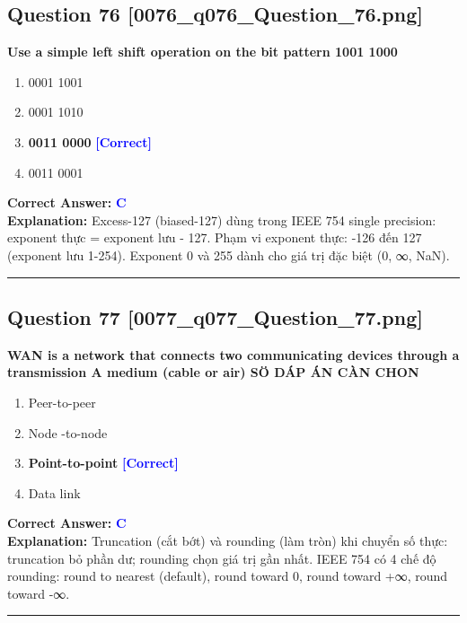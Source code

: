 \documentclass[11pt,a4paper]{article}
\begin{document}
\begin{minipage}{\textwidth}
\subsection*{Question 76 \quad \footnotesize{[0076\_q076\_Question\_76.png]}}
\noindent \textbf{Use a simple left shift operation on the bit pattern 1001 1000}

\begin{enumerate}[label=\Alph*.]
    \item 0001 1001
    \item 0001 1010
    \item \textbf{0011 0000} \hfill \textcolor{blue}{\textbf{[Correct]}}
    \item 0011 0001
\end{enumerate}

\noindent \textbf{Correct Answer:} \textcolor{blue}{\textbf{C}} \\[2pt]
\noindent \textbf{Explanation:} Excess-127 (biased-127) dùng trong IEEE 754 single precision: exponent thực = exponent lưu - 127. Phạm vi exponent thực: -126 đến 127 (exponent lưu 1-254). Exponent 0 và 255 dành cho giá trị đặc biệt (0, ∞, NaN).

\par\vspace{0.3cm}
\hrule
\vspace{0.3cm}
\end{minipage}

\begin{minipage}{\textwidth}
\subsection*{Question 77 \quad \footnotesize{[0077\_q077\_Question\_77.png]}}
\noindent \textbf{WAN is a network that connects two communicating devices through a transmission A medium (cable or air) SÖ DÁP ÁN CÀN CHON}

\begin{enumerate}[label=\Alph*.]
    \item Peer-to-peer
    \item Node -to-node
    \item \textbf{Point-to-point} \hfill \textcolor{blue}{\textbf{[Correct]}}
    \item Data link
\end{enumerate}

\noindent \textbf{Correct Answer:} \textcolor{blue}{\textbf{C}} \\[2pt]
\noindent \textbf{Explanation:} Truncation (cắt bớt) và rounding (làm tròn) khi chuyển số thực: truncation bỏ phần dư; rounding chọn giá trị gần nhất. IEEE 754 có 4 chế độ rounding: round to nearest (default), round toward 0, round toward +∞, round toward -∞.

\par\vspace{0.3cm}
\hrule
\vspace{0.3cm}
\end{minipage}
\end{document}
